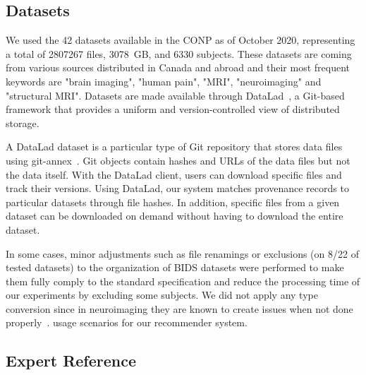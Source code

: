 \subsection{Datasets} 

We used the 42 datasets available in the CONP as of October 2020,
representing a total of 2807267 files, 3078~GB, and 6330 subjects.
These datasets are coming from various sources distributed in Canada and abroad and their most frequent keywords are "brain imaging", "human pain", "MRI", "neuroimaging" and "structural MRI".
 Datasets are made available through DataLad~\cite{datalad2021},
a Git-based framework that provides a uniform and version-controlled view of
distributed storage.

A DataLad dataset is a particular type of Git repository that stores
 data files using git-annex~\cite{gitannex}. Git objects contain
hashes and URLs of the data files but not the data itself. With the DataLad
client, users can download specific files and track their versions. Using
DataLad, our system matches provenance records to particular datasets
through file hashes. In addition, specific files from a given dataset can
be downloaded on demand without having to download the entire dataset. 

 In some cases, minor adjustments such as file renamings or exclusions (on 8/22 of tested datasets) to the organization of BIDS datasets were performed to make them fully comply to the standard specification and reduce the processing time of our experiments by excluding some subjects. We did not apply any type conversion since in neuroimaging they are known to create issues when not done properly~\cite{li2016first}. 
 usage scenarios for our recommender system.
 


\subsection{Expert Reference}

